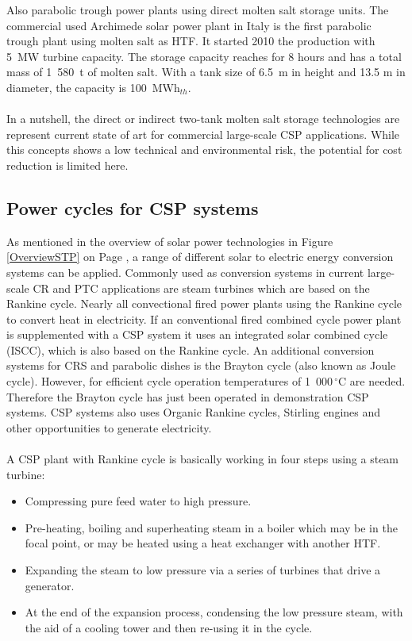 \documentclass[Master,MEE,english]{twbook}%
\begin{document}
Also parabolic trough power plants using direct molten salt storage units. The commercial used Archimede solar power plant in Italy is the first parabolic trough plant using molten salt as HTF. It started 2010 the production with 5~MW turbine capacity. The storage capacity reaches for 8 hours and has a total mass of 1~580~t of molten salt. With a tank size of 6.5~m in height and 13.5 m in diameter, the capacity is 100~MWh$_{th}$. \cite{NREL2012}\\
\\
In a nutshell, the direct or indirect two-tank molten salt storage technologies are represent current state of art for commercial large-scale CSP applications. While this concepts shows a low technical and environmental risk, the potential for cost reduction is limited here. 
\subsection{Power cycles for CSP systems} \label{subsection_powerblock}
As mentioned in the overview of solar power technologies in Figure \ref{OverviewSTP} on Page \pageref{OverviewSTP}, a range of different solar to electric energy conversion systems can be applied. Commonly used as conversion systems in current large-scale CR and PTC applications are steam turbines which are based on the Rankine cycle. Nearly all convectional fired power plants using the Rankine cycle to convert heat in electricity. If an conventional fired combined cycle power plant is supplemented with a CSP system it uses an integrated solar combined cycle (ISCC), which is also based on the Rankine cycle. An additional conversion systems for CRS and parabolic dishes is the Brayton cycle (also known as Joule cycle). However, for efficient cycle operation temperatures of 1~000$\,^{\circ}\mathrm{C}$ are needed. Therefore the Brayton cycle has just been operated in demonstration CSP systems. CSP systems also uses Organic Rankine cycles, Stirling engines and other opportunities to generate electricity. \cite{Lovegrove2012}\\
\\
A CSP plant with Rankine cycle is basically working in four steps using a steam turbine:
\begin{itemize}
\item Compressing pure feed water to high pressure. 
\item Pre-heating, boiling and superheating steam in a boiler which may be in the focal point, or may be heated using a heat exchanger with another HTF. 
\item Expanding the steam to low pressure via a series of turbines that drive a generator.
\item At the end of the expansion process, condensing the low pressure steam, with the aid of a cooling tower and then re-using it in the cycle.
\end{itemize}
\newpage
\end{document}
